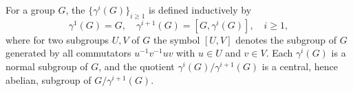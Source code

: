 For a group $G$, the  $\{\gamma^i(G)\}_{i \geq 1}$ is defined inductively by
$$
\gamma^1(G) = G, \quad \gamma^{i+1}(G) = [G, \gamma^i(G)], \quad i \geq 1,
$$
where for two subgroups $U, V$ of $G$ the symbol $[U, V]$ denotes the subgroup of $G$ generated by all commutators $u^{-1}v^{-1}uv$ with $u \in U$ and $v \in V$. Each $\gamma^i(G)$ is a normal subgroup of $G$, and the quotient $\gamma^i(G)/\gamma^{i+1}(G)$ is a central, hence abelian, subgroup of $G/\gamma^{i+1}(G)$.
